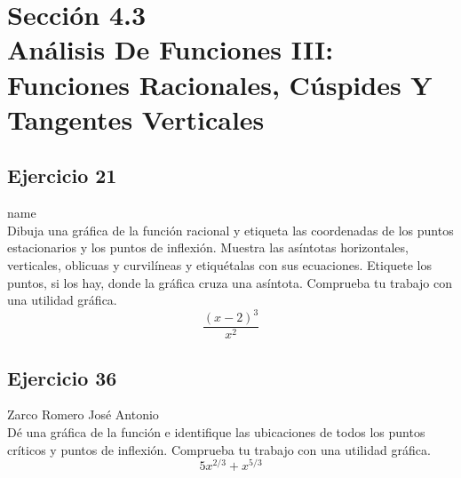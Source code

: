 \documentclass[12pt]{article}
\begin{document}
\section{Sección 4.3 \\  Análisis De Funciones III: Funciones Racionales, Cúspides Y Tangentes Verticales}
\subsection{Ejercicio 21} name \\

Dibuja una gráfica de la función racional y etiqueta las coordenadas de los puntos estacionarios y los puntos de inflexión. Muestra las asíntotas horizontales, verticales, oblicuas y curvilíneas y etiquétalas con sus ecuaciones. Etiquete los puntos, si los hay, donde la gráfica cruza una asíntota. Comprueba tu trabajo con una utilidad gráfica.
\[
\frac{(x-2)^3}{x^2}
\]

\subsection{Ejercicio 36} Zarco Romero José Antonio \\

Dé una gráfica de la función e identifique las ubicaciones de todos los puntos críticos y puntos de inflexión. Comprueba tu trabajo con una utilidad gráfica.
\[
5x^{2/3}+x^{5/3}
\]
\end{document}
